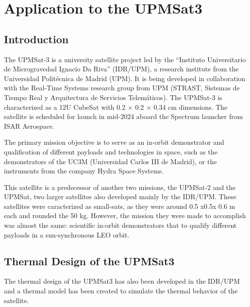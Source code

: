 \chapter{Application to the UPMSat3}\label{ch:04}
\section{Introduction}

The UPMSat-3 is a university satellite project led by the “Instituto Universitario de Microgravedad  Ignacio Da Riva” (IDR/UPM), a research institute from the Universidad Politécnica de Madrid (UPM). It is being developed in collaboration with the Real-Time Systems research group from UPM (STRAST, Sistemas de Tiempo Real y Arquitectura de Servicios Telemáticos). The UPMSat-3 is characterized as a 12U CubeSat with 0.2 × 0.2 × 0.34 cm dimensions. The satellite is scheduled for launch in mid-2024 aboard the Spectrum launcher from ISAR Aerospace. 

The primary mission objective is to serve as an in-orbit demonstrator and qualification of
different payloads and technologies in space, such as the demonstrators of the UC3M (Universidad Carlos III de Madrid), or the instruments from the company Hydra Space Systems.

This satellite is a predecessor of another two missions, the UPMSat-2 and the UPMSat, two larger satellites also developed mainly by the IDR/UPM. These satellites were caracterized as small-sats, as they were around 0.5 x0.5x 0.6 m each and rounded the 50 kg. However, the mission they were made to accomplish was almost the same: scientific in-orbit demonstrators that to qualify different payloads in a sun-synchronous LEO orbit.


\section{Thermal Design of the UPMSat3}
The thermal design of the UPMSat3 has also been developed in the IDR/UPM and a thermal model has been created to simulate the thermal behavior of the satellite. 
